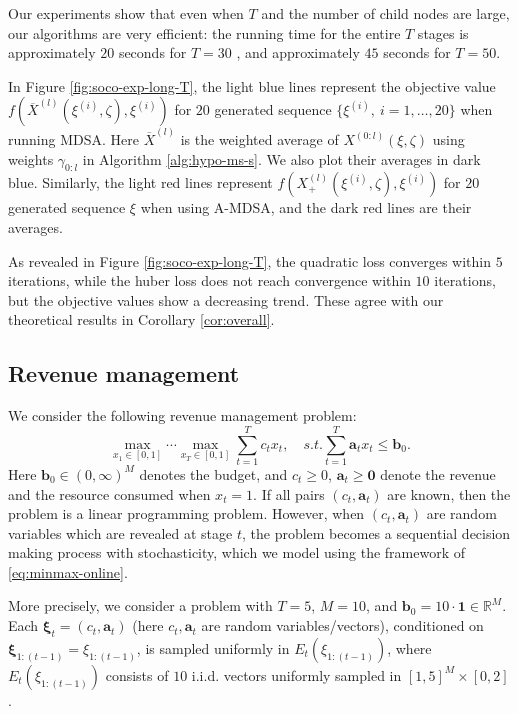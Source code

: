 \documentclass[11pt,fullpage,letterpaper]{article}
\newcommand{\mb}{\mathbf}
\newcommand{\R}{\mathbb{R}}
\newcommand{\bx}{\boldsymbol{\xi}}
\begin{document}
Our experiments show that even when $T$ and the number of child nodes are large, our algorithms are very efficient: the running time for the entire $T$ stages is approximately $ 20$ seconds for $T = 30$ , and approximately $45$ seconds for $T = 50$. 

In Figure \ref{fig:soco-exp-long-T}, the light blue lines represent the objective value $f(\overline{X}^{(l)}(\xi^{(i)},\zeta),\xi^{(i)})$ for $20$ generated sequence $\{\xi^{(i)},~i=1,\ldots,20\}$ when running MDSA. Here $\overline{X}^{(l)}$ is the weighted average of $X^{(0:l)}(\xi,\zeta)$ using weights $\gamma_{0:l}$ in Algorithm \ref{alg:hypo-ms-s}. We also plot their averages in dark blue. Similarly, the light red lines represent $f(X_+^{(l)}(\xi^{(i)},\zeta),\xi^{(i)})$ for $20$ generated sequence $\xi$ when using A-MDSA, and the dark red lines are their averages. 

As revealed in Figure \ref{fig:soco-exp-long-T}, the quadratic loss converges within $5$ iterations, while the huber loss does not reach convergence within $10$ iterations, but the objective values show a decreasing trend. These agree with our theoretical results in Corollary \ref{cor:overall}.

\subsection{Revenue management}\label{sec:exp_rm}
We consider the following revenue management problem:
\begin{displaymath}
    \max_{x_1\in [0,1]}\cdots \max_{x_T\in [0,1]} \sum_{t=1}^T c_tx_t,\quad s.t. \sum_{t=1}^T\mb a_tx_t\leq \mb b_0.
\end{displaymath}
Here $\mb b_0 \in (0,\infty)^M$ denotes the budget, and $c_t\geq 0$, $\mb a_t\geq \mb 0$ denote the revenue and the resource consumed when $x_t  =1$. If all pairs $(c_t,\mb a_t)$ are known, then the problem is a linear programming problem. However, when $(c_t,\mb a_t)$ are random variables which are revealed at stage $t$, the problem becomes a sequential decision making process with stochasticity, which we model using the framework of \eqref{eq:minmax-online}. 


More precisely, we consider a problem with $T = 5$, $M = 10$, and $\mb b_0= 10\cdot \mb 1\in \R^M$.  Each $\bx_t = (c_t,\mb a_t)$ (here $c_t,\mb a_t$ are random variables/vectors), conditioned on $\bx_{1:(t-1)} = \xi_{1:(t-1)}$, is sampled uniformly in $E_t(\xi_{1:(t-1)})$, where $E_t(\xi_{1:(t-1)})$ consists of $10$ i.i.d. vectors uniformly sampled in $[1,5]^M\times [0,2]$. 
\end{document}
